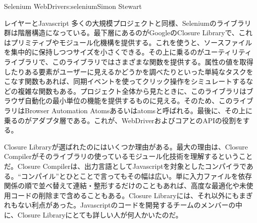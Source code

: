 \begin{aosachapter}{Selenium WebDriver}{s:selenium}{Simon Stewart}
\begin{aosasect1}{レイヤーとJavascript}
多くの大規模プロジェクトと同様、Seleniumのライブラリ群は階層構造になっている。最下層にあるのがGoogleのClosure Libraryで、これはプリミティブやモジュール化機構を提供する。これを使うと、ソースファイルを集中的に保持しつつサイズを小さくできる。その上に乗るのがユーティリティライブラリで、このライブラリではさまざまな関数を提供する。属性の値を取得したりある要素がユーザーに見えるかどうかを調べたりといった単純なタスクをこなす関数もあれば、同期イベントを使ってクリック操作をシミュレートするなどの複雑な関数もある。プロジェクト全体から見たときに、このライブラリはブラウザ自動化の最小単位の機能を提供するものに見える。そのため、このライブラリはBrowser Automation Atomsあるいはatomsと呼ばれる。最後に、その上に乗るのがアダプタ層である。これが、WebDriverおよびコアとのAPIの役割をする。


Closure Libraryが選ばれたのにはいくつか理由がある。最大の理由は、Closure Compilerがそのライブラリの使っているモジュール化技術を理解するということだ。Closure Compilerは、出力言語としてJavascriptを対象としたコンパイラである。``コンパイル''とひとことで言ってもその幅は広い。単に入力ファイルを依存関係の順で並べ替えて連結・整形するだけのこともあれば、高度な最適化や未使用コードの削除まで含めることもある。Closure Libraryには、それ以外にもまぎれもない利点があった。Javascriptのコードを開発するチームのメンバーの中に、Closure Libraryにとても詳しい人が何人かいたのだ。


\end{aosasect1}
\end{aosachapter}
